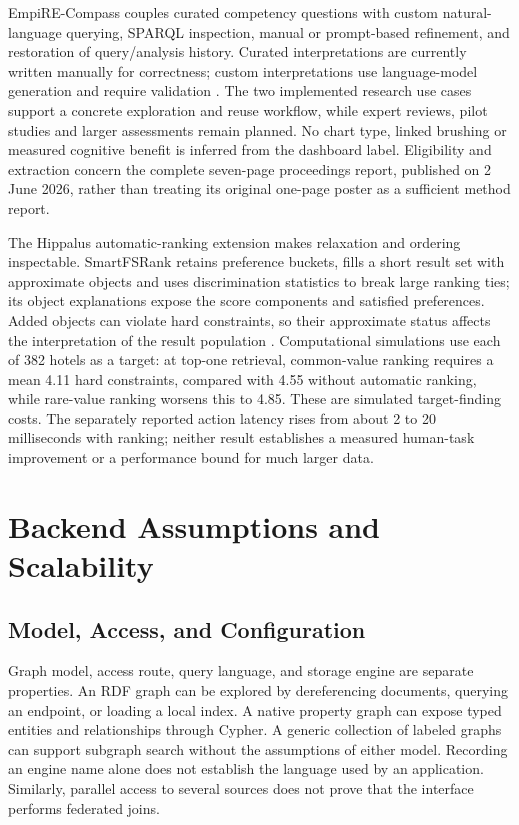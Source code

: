 \documentclass[manuscript,review,screen]{acmart}
\begin{document}
EmpiRE-Compass couples curated competency questions with custom natural-language querying, SPARQL inspection, manual or prompt-based refinement, and restoration of query/analysis history. Curated interpretations are currently written manually for correctness; custom interpretations use language-model generation and require validation \citep{V3-00942}. The two implemented research use cases support a concrete exploration and reuse workflow, while expert reviews, pilot studies and larger assessments remain planned. No chart type, linked brushing or measured cognitive benefit is inferred from the dashboard label. Eligibility and extraction concern the complete seven-page proceedings report, published on 2 June 2026, rather than treating its original one-page poster as a sufficient method report.

The Hippalus automatic-ranking extension makes relaxation and ordering inspectable. SmartFSRank retains preference buckets, fills a short result set with approximate objects and uses discrimination statistics to break large ranking ties; its object explanations expose the score components and satisfied preferences. Added objects can violate hard constraints, so their approximate status affects the interpretation of the result population \citep{V3-01079}. Computational simulations use each of 382 hotels as a target: at top-one retrieval, common-value ranking requires a mean 4.11 hard constraints, compared with 4.55 without automatic ranking, while rare-value ranking worsens this to 4.85. These are simulated target-finding costs. The separately reported action latency rises from about 2 to 20 milliseconds with ranking; neither result establishes a measured human-task improvement or a performance bound for much larger data.

\section{Backend Assumptions and Scalability}
\subsection{Model, Access, and Configuration}
Graph model, access route, query language, and storage engine are separate properties. An RDF graph can be explored by dereferencing documents, querying an endpoint, or loading a local index. A native property graph can expose typed entities and relationships through Cypher. A generic collection of labeled graphs can support subgraph search without the assumptions of either model. Recording an engine name alone does not establish the language used by an application. Similarly, parallel access to several sources does not prove that the interface performs federated joins.
\end{document}
